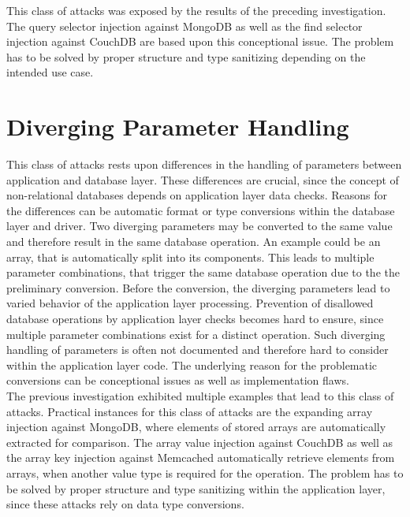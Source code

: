 This class of attacks was exposed by the results of the preceding investigation. The query selector injection against MongoDB as well as the find selector injection against CouchDB are based upon this conceptional issue. The problem has to be solved by proper structure and type sanitizing depending on the intended use case.

\section{Diverging Parameter Handling}
This class of attacks rests upon differences in the handling of parameters between application and database layer. These differences are crucial, since the concept of non-relational databases depends on application layer data checks. Reasons for the differences can be automatic format or type conversions within the database layer and driver. Two diverging parameters may be converted to the same value and therefore result in the same database operation. An example could be an array, that is automatically split into its components. This leads to multiple parameter combinations, that trigger the same database operation due to the the preliminary conversion. Before the conversion, the diverging parameters lead to varied behavior of the application layer processing. Prevention of disallowed database operations by application layer checks becomes hard to ensure, since multiple parameter combinations exist for a distinct operation. Such diverging handling of parameters is often not documented and therefore hard to consider within the application layer code. The underlying reason for the problematic conversions can be conceptional issues as well as implementation flaws.\\

The previous investigation exhibited multiple examples that lead to this class of attacks. Practical instances for this class of attacks are the expanding array injection against MongoDB, where elements of stored arrays are automatically extracted for comparison. The array value injection against CouchDB as well as the array key injection against Memcached automatically retrieve elements from arrays, when another value type is required for the operation. The problem has to be solved by proper structure and type sanitizing within the application layer, since these attacks rely on data type conversions.

